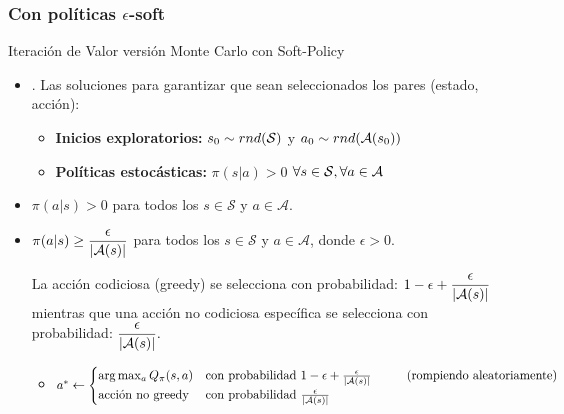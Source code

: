 \documentclass[10pt, envcountsect, handout, aspectratio=1610, hyperref={hypertexnames=true}]{beamer}
\begin{document}
\subsubsection{Con políticas $\epsilon$-soft}


\begin{frame}{Iteración de Valor versión Monte Carlo con Soft-Policy}{\cite{Sutton2018}}
	
	
	\begin{itemize}
		\item {}. Las soluciones para garantizar que sean seleccionados los pares (estado, acción):
		\begin{itemize}
			\item \textbf{Inicios exploratorios:} $s_0 \sim rnd({\cal S})$ y $a_0\sim rnd({\cal A}(s_0))$
			\item \textbf{Políticas estocásticas:} $\pi(s|a)>0$ \quad $\forall s \in {\cal S}, \forall a\in {\cal A}$
		\end{itemize}
		
		\item {} \(\pi(a|s) > 0\) para todos los \(s \in \mathcal{S}\) y \(a \in \mathcal{A}\).
		
		\item {} \(\displaystyle \pi(a|s) \geq \frac{\epsilon}{|\mathcal{A}(s)|}\) para todos los \(s \in \mathcal{S}\) y \(a \in \mathcal{A}\), donde \(\epsilon > 0\).
		
		
		
		
		La acción codiciosa (greedy) se selecciona con probabilidad:
		$\displaystyle
		1 - \epsilon + \frac{\epsilon}{|\mathcal{A}(s)|}
		$
		mientras que una acción no codiciosa específica se selecciona con probabilidad:
		$\displaystyle
		\frac{\epsilon}{|\mathcal{A}(s)|}.
		$
		
		\begin{itemize}
			\item {}
			
			\hfil $a^* \gets
			\begin{cases}
				\arg\max_a Q_\pi(s,a) & \text{\color{black} con probabilidad } 1 - \epsilon + \frac{\epsilon}{|\mathcal{A}(s)|} \mbox{\hspace{1cm}\color{black}  (rompiendo aleatoriamente)} \\
				\text{acción no greedy} & \text{\color{black} con probabilidad }  \frac{\epsilon}{|\mathcal{A}(s)|}
			\end{cases}$
			

\end{itemize}
\end{itemize}
\end{frame}
\end{document}
